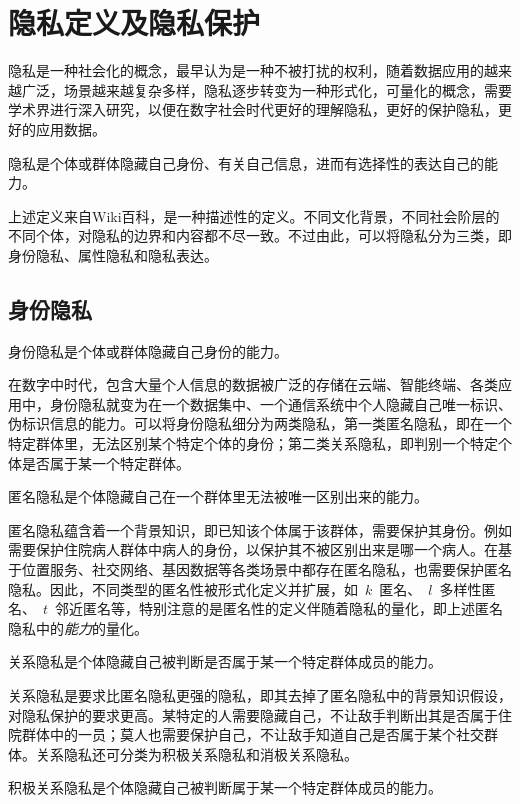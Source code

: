 \section{隐私定义及隐私保护}
隐私是一种社会化的概念，最早认为是一种不被打扰的权利，随着数据应用的越来越广泛，场景越来越复杂多样，隐私逐步转变为一种形式化，可量化的概念，需要学术界进行深入研究，以便在数字社会时代更好的理解隐私，更好的保护隐私，更好的应用数据。

\begin{definition}
	隐私是个体或群体隐藏自己身份、有关自己信息，进而有选择性的表达自己的能力。
\end{definition}

上述定义来自Wiki百科，是一种描述性的定义。不同文化背景，不同社会阶层的不同个体，对隐私的边界和内容都不尽一致。不过由此，可以将隐私分为三类，即身份隐私、属性隐私和隐私表达。

\subsection{身份隐私}
\begin{definition}
身份隐私是个体或群体隐藏自己身份的能力。
\end{definition}

在数字中时代，包含大量个人信息的数据被广泛的存储在云端、智能终端、各类应用中，身份隐私就变为在一个数据集中、一个通信系统中个人隐藏自己唯一标识、伪标识信息的能力。可以将身份隐私细分为两类隐私，第一类匿名隐私，即在一个特定群体里，无法区别某个特定个体的身份；第二类关系隐私，即判别一个特定个体是否属于某一个特定群体。
\begin{definition}
	匿名隐私是个体隐藏自己在一个群体里无法被唯一区别出来的能力。
\end{definition}

匿名隐私蕴含着一个背景知识，即已知该个体属于该群体，需要保护其身份。例如需要保护住院病人群体中病人的身份，以保护其不被区别出来是哪一个病人。在基于位置服务、社交网络、基因数据等各类场景中都存在匿名隐私，也需要保护匿名隐私。因此，不同类型的匿名性被形式化定义并扩展，如~$k$~匿名\cite{sweeney2002k}、~$l$~多样性匿名\cite{machanavajjhala2007l}、~$t$~邻近匿名\cite{li2007t}等，特别注意的是匿名性的定义伴随着隐私的量化，即上述匿名隐私中的\textit{能力}的量化。

\begin{definition}
	关系隐私是个体隐藏自己被判断是否属于某一个特定群体成员的能力。
\end{definition}

关系隐私是要求比匿名隐私更强的隐私，即其去掉了匿名隐私中的背景知识假设，对隐私保护的要求更高。某特定的人需要隐藏自己，不让敌手判断出其是否属于住院群体中的一员；莫人也需要保护自己，不让敌手知道自己是否属于某个社交群体。关系隐私还可分类为积极关系隐私和消极关系隐私。
\begin{definition}
	积极关系隐私是个体隐藏自己被判断属于某一个特定群体成员的能力。
\end{definition}

